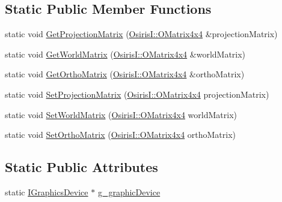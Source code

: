 \subsection*{Static Public Member Functions}
\begin{DoxyCompactItemize}
\item 
static void \hyperlink{class_osiris_i_1_1_graphics_1_1_devices_1_1_i_graphics_device_ae69091ad2653de0b5600abd4605dd06a}{Get\-Projection\-Matrix} (\hyperlink{struct_osiris_i_1_1_o_matrix4x4}{Osiris\-I\-::\-O\-Matrix4x4} \&projection\-Matrix)
\item 
static void \hyperlink{class_osiris_i_1_1_graphics_1_1_devices_1_1_i_graphics_device_a51f929fd7c2562127c1b13aba30c3eb9}{Get\-World\-Matrix} (\hyperlink{struct_osiris_i_1_1_o_matrix4x4}{Osiris\-I\-::\-O\-Matrix4x4} \&world\-Matrix)
\item 
static void \hyperlink{class_osiris_i_1_1_graphics_1_1_devices_1_1_i_graphics_device_af8f7bf58a3883f353d7848a3ece6c80e}{Get\-Ortho\-Matrix} (\hyperlink{struct_osiris_i_1_1_o_matrix4x4}{Osiris\-I\-::\-O\-Matrix4x4} \&ortho\-Matrix)
\item 
static void \hyperlink{class_osiris_i_1_1_graphics_1_1_devices_1_1_i_graphics_device_a29ff99fa15d6ea8d5d9e16f8b1a81c0e}{Set\-Projection\-Matrix} (\hyperlink{struct_osiris_i_1_1_o_matrix4x4}{Osiris\-I\-::\-O\-Matrix4x4} projection\-Matrix)
\item 
static void \hyperlink{class_osiris_i_1_1_graphics_1_1_devices_1_1_i_graphics_device_a0918cd00eaf4ec145714748221445e39}{Set\-World\-Matrix} (\hyperlink{struct_osiris_i_1_1_o_matrix4x4}{Osiris\-I\-::\-O\-Matrix4x4} world\-Matrix)
\item 
static void \hyperlink{class_osiris_i_1_1_graphics_1_1_devices_1_1_i_graphics_device_ad6bc10aade1c7c7438ca229106101e9e}{Set\-Ortho\-Matrix} (\hyperlink{struct_osiris_i_1_1_o_matrix4x4}{Osiris\-I\-::\-O\-Matrix4x4} ortho\-Matrix)
\end{DoxyCompactItemize}
\subsection*{Static Public Attributes}
\begin{DoxyCompactItemize}
\item 
static \hyperlink{class_osiris_i_1_1_graphics_1_1_devices_1_1_i_graphics_device}{I\-Graphics\-Device} $\ast$ \hyperlink{class_osiris_i_1_1_graphics_1_1_devices_1_1_i_graphics_device_ab8b2595c8bf8079b2b1a2336c29624d4}{g\-\_\-graphic\-Device}
\end{DoxyCompactItemize}

